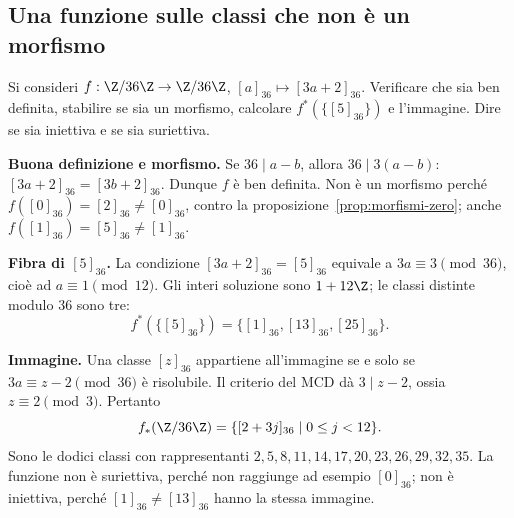 \subsection{Una funzione sulle classi che non è un morfismo}
\begin{esercizio}
Si consideri $f:\Z/36\Z\to\Z/36\Z$, $[a]_{36}\mapsto[3a+2]_{36}$. Verificare che sia ben definita, stabilire se sia un morfismo, calcolare $f^*(\{[5]_{36}\})$ e l'immagine. Dire se sia iniettiva e se sia suriettiva.
\end{esercizio}
\begin{svolgimento}
\textbf{Buona definizione e morfismo.} Se $36\mid a-b$, allora $36\mid3(a-b)$: $[3a+2]_{36}=[3b+2]_{36}$. Dunque $f$ è ben definita. Non è un morfismo perché $f([0]_{36})=[2]_{36}\ne[0]_{36}$, contro la proposizione~\ref{prop:morfismi-zero}; anche $f([1]_{36})=[5]_{36}\ne[1]_{36}$.

\textbf{Fibra di $[5]_{36}$.} La condizione $[3a+2]_{36}=[5]_{36}$ equivale a $3a\equiv3\pmod{36}$, cioè ad $a\equiv1\pmod{12}$. Gli interi soluzione sono $1+12\Z$; le classi distinte modulo $36$ sono tre:
\[
f^*(\{[5]_{36}\})=\{[1]_{36},[13]_{36},[25]_{36}\}.
\]

\textbf{Immagine.} Una classe $[z]_{36}$ appartiene all'immagine se e solo se $3a\equiv z-2\pmod{36}$ è risolubile. Il criterio del MCD dà $3\mid z-2$, ossia $z\equiv2\pmod3$. Pertanto
\[
f_*(\Z/36\Z)=\{[2+3j]_{36}\mid 0\le j<12\}.
\]
Sono le dodici classi con rappresentanti $2,5,8,11,14,17,20,23,26,29,32,35$. La funzione non è suriettiva, perché non raggiunge ad esempio $[0]_{36}$; non è iniettiva, perché $[1]_{36}\ne[13]_{36}$ hanno la stessa immagine.
\end{svolgimento}
